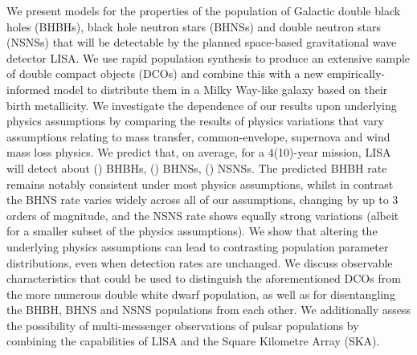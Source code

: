 We present models for the properties of the population of Galactic double black holes (BHBHs), black hole neutron stars (BHNSs) and double neutron stars (NSNSs) that will be detectable by the planned space-based gravitational wave detector LISA. We use rapid population synthesis to produce an extensive sample of double compact objects (DCOs) and combine this with a new empirically-informed model to distribute them in a Milky Way-like galaxy based on their birth metallicity. We investigate the dependence of our results upon underlying physics assumptions by comparing the results of \nModels{} physics variations that vary assumptions relating to mass transfer, common-envelope, supernova and wind mass loss physics. We predict that, on average, for a 4(10)-year mission, LISA will detect about \BHBHFourYear{}(\BHBHTenYear{}) BHBHs, \BHNSFourYear{}(\BHNSTenYear{}) BHNSs, \NSNSFourYear{}(\NSNSTenYear{}) NSNSs. The predicted BHBH rate remains notably consistent under most physics assumptions, whilst in contrast the BHNS rate varies widely across all of our assumptions, changing by up to 3 orders of magnitude, and the NSNS rate shows equally strong variations (albeit for a smaller subset of the physics assumptions). We show that altering the underlying physics assumptions can lead to contrasting population parameter distributions, even when detection rates are unchanged. We discuss observable characteristics that could be used to distinguish the aforementioned DCOs from the more numerous double white dwarf population, as well as for disentangling the BHBH, BHNS and NSNS populations from each other. We additionally assess the possibility of multi-messenger observations of pulsar populations by combining the capabilities of LISA and the Square Kilometre Array (SKA). 